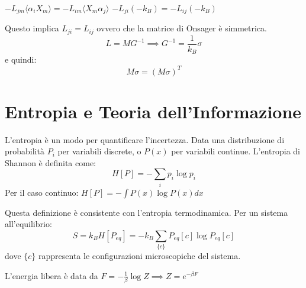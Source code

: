 $-L_{jm}\langle\alpha_{i}X_{m}\rangle = -L_{im}\langle X_{m}\alpha_{j}\rangle$
$-L_{ji}(-k_B) = -L_{ij}(-k_B)$

\noindent Questo implica $L_{ji} = L_{ij}$ ovvero che la matrice di Onsager è simmetrica.
\begin{equation}
L=MG^{-1} \implies G^{-1}=\frac{1}{k_{B}}\sigma
\end{equation}
e quindi:
\begin{equation}
M\sigma = (M \sigma)^T 
\end{equation}

\section{Entropia e Teoria dell'Informazione}
L'entropia è un modo per quantificare l'incertezza. Data una distribuzione di probabilità $P_i$ per variabili discrete, o $P(x)$ per variabili continue.
L'entropia di Shannon è definita come:
\begin{equation}
H[P]=-\sum_{i}p_{i}\log p_{i}
\end{equation}
Per il caso continuo: $H[P]=-\int P(x)\log P(x) dx$

\noindent Questa definizione è consistente con l'entropia termodinamica. Per un sistema all'equilibrio:
\begin{equation}
S=k_{B}H[P_{eq}]=-k_{B}\sum_{\{c\}}P_{eq}[c]\log P_{eq}[c]
\end{equation}
dove $\{c\}$ rappresenta le configurazioni microscopiche del sistema.

\noindent L'energia libera è data da $F=-\frac{1}{\beta}\log Z \implies Z=e^{-\beta F}$

